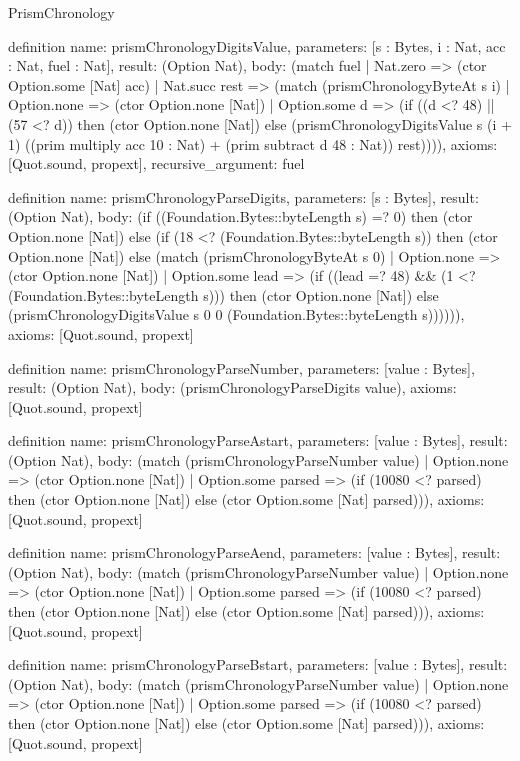 \begin{lexlean}{PrismChronology}
\begin{semanticmodule}
definition{
  name: prismChronologyDigitsValue,
  parameters: [s : Bytes, i : Nat, acc : Nat, fuel : Nat],
  result: (Option Nat),
  body: (match fuel
    | Nat.zero => (ctor Option.some [Nat] acc)
    | Nat.succ rest => (match (prismChronologyByteAt s i)
      | Option.none => (ctor Option.none [Nat])
      | Option.some d => (if ((d <? 48) || (57 <? d)) then (ctor Option.none [Nat]) else (prismChronologyDigitsValue s (i + 1) ((prim multiply acc 10 : Nat) + (prim subtract d 48 : Nat)) rest)))),
  axioms: [Quot.sound, propext],
  recursive_argument: fuel
}

definition{
  name: prismChronologyParseDigits,
  parameters: [s : Bytes],
  result: (Option Nat),
  body: (if ((Foundation.Bytes::byteLength s) =? 0) then (ctor Option.none [Nat]) else (if (18 <? (Foundation.Bytes::byteLength s)) then (ctor Option.none [Nat]) else (match (prismChronologyByteAt s 0)
    | Option.none => (ctor Option.none [Nat])
    | Option.some lead => (if ((lead =? 48) && (1 <? (Foundation.Bytes::byteLength s))) then (ctor Option.none [Nat]) else (prismChronologyDigitsValue s 0 0 (Foundation.Bytes::byteLength s)))))),
  axioms: [Quot.sound, propext]
}

definition{
  name: prismChronologyParseNumber,
  parameters: [value : Bytes],
  result: (Option Nat),
  body: (prismChronologyParseDigits value),
  axioms: [Quot.sound, propext]
}

definition{
  name: prismChronologyParseAstart,
  parameters: [value : Bytes],
  result: (Option Nat),
  body: (match (prismChronologyParseNumber value)
    | Option.none => (ctor Option.none [Nat])
    | Option.some parsed => (if (10080 <? parsed) then (ctor Option.none [Nat]) else (ctor Option.some [Nat] parsed))),
  axioms: [Quot.sound, propext]
}

definition{
  name: prismChronologyParseAend,
  parameters: [value : Bytes],
  result: (Option Nat),
  body: (match (prismChronologyParseNumber value)
    | Option.none => (ctor Option.none [Nat])
    | Option.some parsed => (if (10080 <? parsed) then (ctor Option.none [Nat]) else (ctor Option.some [Nat] parsed))),
  axioms: [Quot.sound, propext]
}

definition{
  name: prismChronologyParseBstart,
  parameters: [value : Bytes],
  result: (Option Nat),
  body: (match (prismChronologyParseNumber value)
    | Option.none => (ctor Option.none [Nat])
    | Option.some parsed => (if (10080 <? parsed) then (ctor Option.none [Nat]) else (ctor Option.some [Nat] parsed))),
  axioms: [Quot.sound, propext]
}


\end{semanticmodule}
\end{lexlean}

